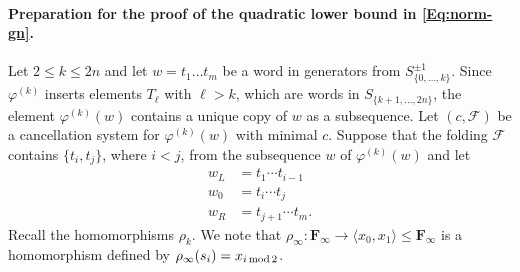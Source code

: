 \documentclass[12pt,reqno,a4paper]{article}
\theoremstyle{definition}
\theoremstyle{remark}
\numberwithin{equation}{section}
\numberwithin{figure}{section}
\newcommand{\B}[1]{{\mathbf #1}}
\newcommand{\C}[1]{{\mathscr #1}}
\begin{document}
\paragraph{Preparation for the proof of the quadratic lower bound in \eqref{Eq:norm-gn}.}

Let $2\leq k \leq 2n$ and let $w=t_1\dots t_m$ be a word in generators 
from $S_{\{0,\ldots,k\}}^{\pm 1}$.
Since $\varphi^{(k)}$ inserts elements $T_{\ell}$ with $\ell>k$, which are words in
$S_{\{k+1,\ldots ,2n\}}$, the element $\varphi^{(k)}(w)$ contains a unique copy
of $w$ as a subsequence.
Let $(c,\C F)$ be a cancellation system for $\varphi^{(k)}(w)$ with minimal $c$.
Suppose that the folding $\C F$ contains $\{t_i,t_j\}$, where $i<j$, from the subsequence 
$w$ of $\varphi^{(k)}(w)$
and let 
\begin{align*}
w_L &= t_1 \cdots t_{i-1}\\
w_0 &= t_i\cdots t_{j}\\
w_R &= t_{j+1} \cdots t_{m}.
\end{align*}
Recall the homomorphisms $\rho_k$.
We note that $\rho_{\infty}\colon \B F_{\infty}\to \langle x_0,x_1\rangle\leq \B F_{\infty}$ is a homomorphism defined by $\rho_{\infty}(s_i)=x_{i\,{\rm mod}\,2}$.
\end{document}
